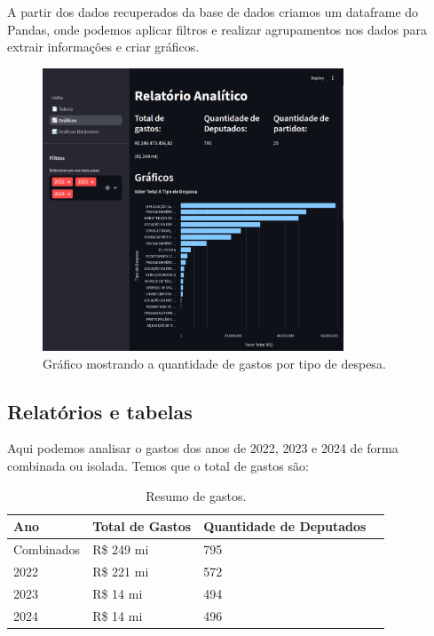 \documentclass[12pt, a4paper]{article}
\begin{document}
A partir dos dados recuperados da base de dados criamos um dataframe do Pandas\cite{Pandas}, onde podemos aplicar filtros e realizar agrupamentos nos dados para extrair informações e criar gráficos.


\begin{figure}[!htbp]
	\centering
	\includegraphics[width=0.8\textwidth]{assets/2_plot1.png}
	\caption{Gráfico mostrando a quantidade de gastos por tipo de despesa.}
	\label{fig:criacao_postgresql}
\end{figure}

\subsection{Relatórios e tabelas}

Aqui podemos analisar o gastos dos anos de 2022, 2023 e 2024 de forma combinada ou isolada. Temos que o total de gastos são:

\begin{table}[htbp]
	\centering
	\begin{tabular}{llll}
		\toprule
		Ano & Total de Gastos & Quantidade de Deputados \\
		\midrule
		Combinados & R\$ 249 mi & 795 \\
		2022 & R\$ 221 mi & 572 \\
		2023 & R\$ 14 mi & 494 \\
		2024 & R\$ 14 mi & 496 \\
		\bottomrule
	\end{tabular}
	\caption{Resumo de gastos.}
	\label{tab:minhatabela1}
\end{table}
\end{document}
